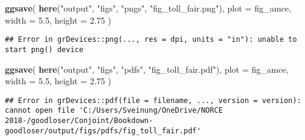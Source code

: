 \documentclass[]{book}
\newenvironment{Shaded}{\begin{snugshade}}{\end{snugshade}}
\newcommand{\KeywordTok}[1]{\textcolor[rgb]{0.13,0.29,0.53}{\textbf{#1}}}
\newcommand{\DataTypeTok}[1]{\textcolor[rgb]{0.13,0.29,0.53}{#1}}
\newcommand{\FloatTok}[1]{\textcolor[rgb]{0.00,0.00,0.81}{#1}}
\newcommand{\StringTok}[1]{\textcolor[rgb]{0.31,0.60,0.02}{#1}}
\newcommand{\NormalTok}[1]{#1}
\begin{document}
\begin{Shaded}
\begin{Highlighting}[]
\KeywordTok{ggsave}\NormalTok{(}
  \KeywordTok{here}\NormalTok{(}\StringTok{"output"}\NormalTok{, }\StringTok{"figs"}\NormalTok{, }\StringTok{"pngs"}\NormalTok{, }\StringTok{"fig_toll_fair.png"}\NormalTok{),}
  \DataTypeTok{plot =}\NormalTok{ fig_amce,}
  \DataTypeTok{width =} \FloatTok{5.5}\NormalTok{, }\DataTypeTok{height =} \FloatTok{2.75}
\NormalTok{)}
\end{Highlighting}
\end{Shaded}

\begin{verbatim}
## Error in grDevices::png(..., res = dpi, units = "in"): unable to start png() device
\end{verbatim}

\begin{Shaded}
\begin{Highlighting}[]
\KeywordTok{ggsave}\NormalTok{(}
  \KeywordTok{here}\NormalTok{(}\StringTok{"output"}\NormalTok{, }\StringTok{"figs"}\NormalTok{, }\StringTok{"pdfs"}\NormalTok{, }\StringTok{"fig_toll_fair.pdf"}\NormalTok{),}
  \DataTypeTok{plot =}\NormalTok{ fig_amce,}
  \DataTypeTok{width =} \FloatTok{5.5}\NormalTok{, }\DataTypeTok{height =} \FloatTok{2.75}
\NormalTok{)}
\end{Highlighting}
\end{Shaded}

\begin{verbatim}
## Error in grDevices::pdf(file = filename, ..., version = version): cannot open file 'C:/Users/Sveinung/OneDrive/NORCE 2018-/goodloser/Conjoint/Bookdown-goodloser/output/figs/pdfs/fig_toll_fair.pdf'
\end{verbatim}
\end{document}
